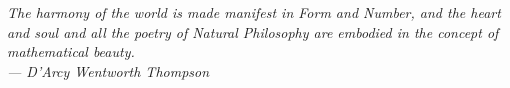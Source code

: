 \documentclass[
    a4paper, %
    fontsize=10pt, %
    twoside=true, %
    numbers=noenddot, %
]{kaobook}
\begin{document}
\intestazione

\begingroup %

\setlength{\textheight}{230\hscale} %

\etocstandarddisplaystyle 
\etocstandardlines 

\tableofcontents %

\endgroup


\mainmatter %

%







\backmatter %

 
\thispagestyle{empty} 
\vspace*{\fill}
\begin{center}
    \itshape 
    The harmony of the world is made manifest in Form and Number, and the heart and soul and all the poetry of Natural Philosophy are embodied in the concept of mathematical beauty.\\
    \medskip
    --- D'Arcy Wentworth Thompson
\end{center}
\vspace*{\fill}
\clearpage
\end{document}
